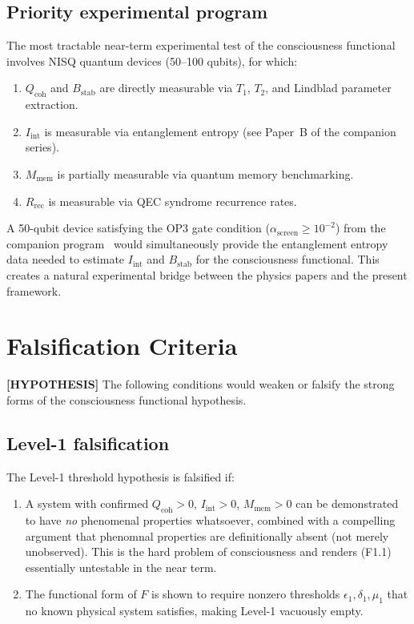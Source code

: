 \documentclass[12pt,letterpaper]{article}
\newcommand{\HYPOTHESIS}[1]{\textcolor{blue!70!black}{\textbf{[HYPOTHESIS]}} #1}
\newcommand{\Qcoh}{Q_{\mathrm{coh}}}
\newcommand{\Iint}{I_{\mathrm{int}}}
\newcommand{\Mmem}{M_{\mathrm{mem}}}
\newcommand{\Bstab}{B_{\mathrm{stab}}}
\newcommand{\Rrec}{R_{\mathrm{rec}}}
\newcommand{\ascreen}{\alpha_{\mathrm{screen}}}
\begin{document}
\subsection{Priority experimental program}

The most tractable near-term experimental test of the consciousness functional
involves NISQ quantum devices (50--100 qubits), for which:
\begin{enumerate}[label=(\roman*)]
  \item $\Qcoh$ and $\Bstab$ are directly measurable via $T_1$, $T_2$,
    and Lindblad parameter extraction.
  \item $\Iint$ is measurable via entanglement entropy (see Paper~B of the
    companion series).
  \item $\Mmem$ is partially measurable via quantum memory benchmarking.
  \item $\Rrec$ is measurable via QEC syndrome recurrence rates.
\end{enumerate}

A 50-qubit device satisfying the OP3 gate condition ($\ascreen \geq 10^{-2}$)
from the companion program~\cite{Monette2026a} would simultaneously provide
the entanglement entropy data needed to estimate $\Iint$ and $\Bstab$ for the
consciousness functional. This creates a natural experimental bridge between
the physics papers and the present framework.

\section{Falsification Criteria}
\label{sec:falsification}

\HYPOTHESIS{} The following conditions would weaken or falsify the strong
forms of the consciousness functional hypothesis.

\subsection{Level-1 falsification}

The Level-1 threshold hypothesis is falsified if:
\begin{enumerate}[label=(F1.\arabic*)]
  \item A system with confirmed $\Qcoh > 0$, $\Iint > 0$, $\Mmem > 0$ can
    be demonstrated to have \emph{no} phenomenal properties whatsoever,
    combined with a compelling argument that phenomnal properties are
    definitionally absent (not merely unobserved). This is the hard problem
    of consciousness and renders (F1.1) essentially untestable in the
    near term.
  \item The functional form of $F$ is shown to require nonzero thresholds
    $\epsilon_1, \delta_1, \mu_1$ that no known physical system satisfies,
    making Level-1 vacuously empty.
\end{enumerate}
\end{document}
